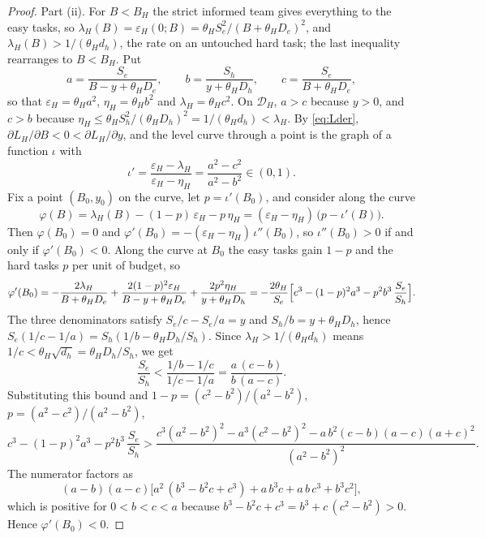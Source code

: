 \documentclass[11pt]{article}
\theoremstyle{definition}
\begin{document}
\begin{proof}
Part (ii). For $B<B_H$ the strict informed team gives everything to the easy tasks, so $\lambda_H(B)=\varepsilon_H(0;B)=\theta_HS_e^2/(B+\theta_HD_e)^2$, and $\lambda_H(B)>1/(\theta_Hd_h)$, the rate on an untouched hard task; the last inequality rearranges to $B<B_H$. Put
\[
a=\frac{S_e}{B-y+\theta_HD_e},\qquad b=\frac{S_h}{y+\theta_HD_h},\qquad c=\frac{S_e}{B+\theta_HD_e},
\]
so that $\varepsilon_H=\theta_Ha^2$, $\eta_H=\theta_Hb^2$ and $\lambda_H=\theta_Hc^2$. On $\mathcal D_H$, $a>c$ because $y>0$, and $c>b$ because $\eta_H\le\theta_HS_h^2/(\theta_HD_h)^2=1/(\theta_Hd_h)<\lambda_H$. By \eqref{eq:Lder}, $\partial L_H/\partial B<0<\partial L_H/\partial y$, and the level curve through a point is the graph of a function $\iota$ with
\[
\iota'=\frac{\varepsilon_H-\lambda_H}{\varepsilon_H-\eta_H}=\frac{a^2-c^2}{a^2-b^2}\in(0,1).
\]
Fix a point $(B_0,y_0)$ on the curve, let $p=\iota'(B_0)$, and consider along the curve
\[
\varphi(B)=\lambda_H(B)-(1-p)\,\varepsilon_H-p\,\eta_H=(\varepsilon_H-\eta_H)\,\bigl(p-\iota'(B)\bigr).
\]
Then $\varphi(B_0)=0$ and $\varphi'(B_0)=-(\varepsilon_H-\eta_H)\,\iota''(B_0)$, so $\iota''(B_0)>0$ if and only if $\varphi'(B_0)<0$. Along the curve at $B_0$ the easy tasks gain $1-p$ and the hard tasks $p$ per unit of budget, so
\[
\varphi'(B_0)=-\frac{2\lambda_H}{B+\theta_HD_e}+\frac{2(1-p)^2\varepsilon_H}{B-y+\theta_HD_e}+\frac{2p^2\eta_H}{y+\theta_HD_h}
=-\frac{2\theta_H}{S_e}\Bigl[c^3-(1-p)^2a^3-p^2b^3\,\frac{S_e}{S_h}\Bigr].
\]
The three denominators satisfy $S_e/c-S_e/a=y$ and $S_h/b=y+\theta_HD_h$, hence $S_e(1/c-1/a)=S_h(1/b-\theta_HD_h/S_h)$. Since $\lambda_H>1/(\theta_Hd_h)$ means $1/c<\theta_H\sqrt{d_h}=\theta_HD_h/S_h$, we get
\[
\frac{S_e}{S_h}<\frac{1/b-1/c}{1/c-1/a}=\frac{a\,(c-b)}{b\,(a-c)} .
\]
Substituting this bound and $1-p=(c^2-b^2)/(a^2-b^2)$, $p=(a^2-c^2)/(a^2-b^2)$,
\[
c^3-(1-p)^2a^3-p^2b^3\,\frac{S_e}{S_h}>\frac{c^3(a^2-b^2)^2-a^3(c^2-b^2)^2-a\,b^2(c-b)(a-c)(a+c)^2}{(a^2-b^2)^2}.
\]
The numerator factors as
\[
(a-b)(a-c)\bigl[a^2\,(b^3-b^2c+c^3)+a\,b^3c+a\,b\,c^3+b^3c^2\bigr],
\]
which is positive for $0<b<c<a$ because $b^3-b^2c+c^3=b^3+c\,(c^2-b^2)>0$. Hence $\varphi'(B_0)<0$.
\end{proof}
\end{document}
